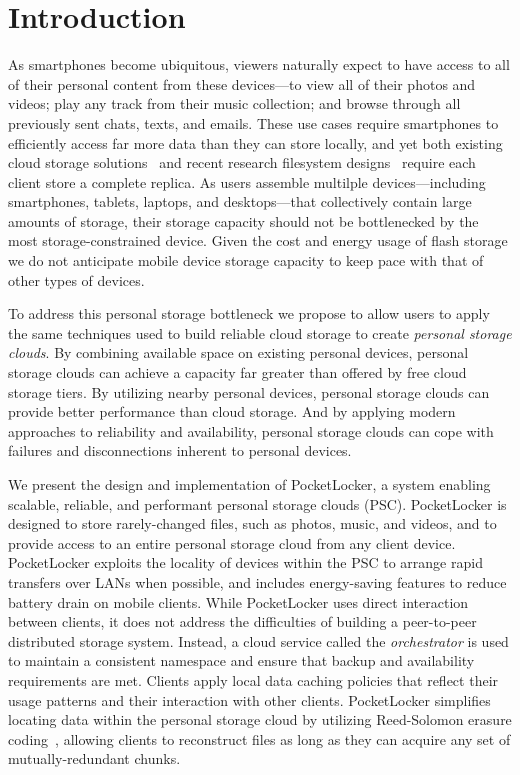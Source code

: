 
\section{Introduction}
\label{sec-introduction}

As smartphones become ubiquitous, viewers naturally expect to have access to
all of their personal content from these devices---to view all of
their photos and videos; play any track from their music collection; and browse
through all previously sent chats, texts, and emails. These
use cases require smartphones to efficiently access far more data than they
can store locally, and yet both existing cloud storage
solutions~\cite{dropbox, googledrive} and recent research filesystem
designs~\cite{mashtizadeh2013replication, peek2006ensemblue} require each
client store a complete replica. As users assemble multilple
devices---including smartphones, tablets, laptops, and desktops---that
collectively contain large amounts of storage, their storage capacity should
not be bottlenecked by the most storage-constrained device. Given the cost
and energy usage of flash storage we do not anticipate mobile device
storage capacity to keep pace with that of other types of devices.

To address this personal storage bottleneck we propose to allow users to
apply the same techniques used to build reliable cloud storage to create
\textit{personal storage clouds}. By combining available space on existing
personal devices, personal storage clouds can achieve a capacity far greater
than offered by free cloud storage tiers. By utilizing nearby personal
devices, personal storage clouds can provide better performance than cloud
storage. And by applying modern approaches to reliability and availability,
personal storage clouds can cope with failures and disconnections inherent to
personal devices.

We present the design and implementation of PocketLocker, a system enabling
scalable, reliable, and performant personal storage clouds (PSC). PocketLocker
is designed to store rarely-changed files, such as photos, music, and videos,
and to provide access to an entire personal storage cloud from any client
device. PocketLocker exploits the locality of devices within the PSC to arrange
rapid transfers over LANs when possible, and includes energy-saving features to
reduce battery drain on mobile clients. While PocketLocker uses direct
interaction between clients, it does not address the difficulties of building a
peer-to-peer distributed storage system. Instead, a cloud service called the
\textit{orchestrator} is used to maintain a consistent namespace and ensure
that backup and availability requirements are met.  Clients apply local data
caching policies that reflect their usage patterns and their interaction with
other clients. PocketLocker simplifies locating data within the personal
storage cloud by utilizing Reed-Solomon erasure
coding~\cite{reed1960polynomial}, allowing clients to reconstruct files as long
as they can acquire any set of mutually-redundant chunks.

